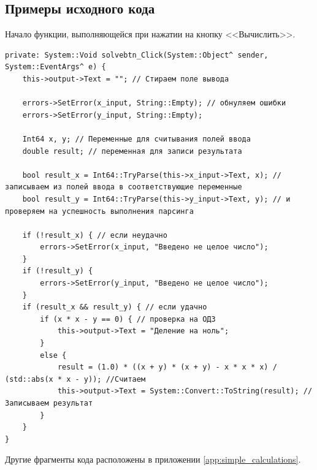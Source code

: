 \subsection{Примеры исходного кода}
Начало функции, выполняющейся при нажатии на кнопку <<Вычислить>>.
\begin{verbatim}
private: System::Void solvebtn_Click(System::Object^ sender, System::EventArgs^ e) {
	this->output->Text = ""; // Стираем поле вывода

	errors->SetError(x_input, String::Empty); // обнуляем ошибки
	errors->SetError(y_input, String::Empty);

	Int64 x, y; // Переменные для считывания полей ввода
	double result; // переменная для записи результата

	bool result_x = Int64::TryParse(this->x_input->Text, x); // записываем из полей ввода в соответствующие переменные
	bool result_y = Int64::TryParse(this->y_input->Text, y); // и проверяем на успешность выполнения парсинга

	if (!result_x) { // если неудачно
		errors->SetError(x_input, "Введено не целое число");
	}
	if (!result_y) {
		errors->SetError(y_input, "Введено не целое число");
	}
	if (result_x && result_y) { // если удачно
		if (x * x - y == 0) { // проверка на ОДЗ
			this->output->Text = "Деление на ноль";
		}
		else {
			result = (1.0) * ((x + y) * (x + y) - x * x * x) / (std::abs(x * x - y)); //Считаем
			this->output->Text = System::Convert::ToString(result); //Записываем результат
		}
	}
}
\end{verbatim}
Другие фрагменты кода расположены в приложении \ref{app:simple_calculations}.
\sectionbreak